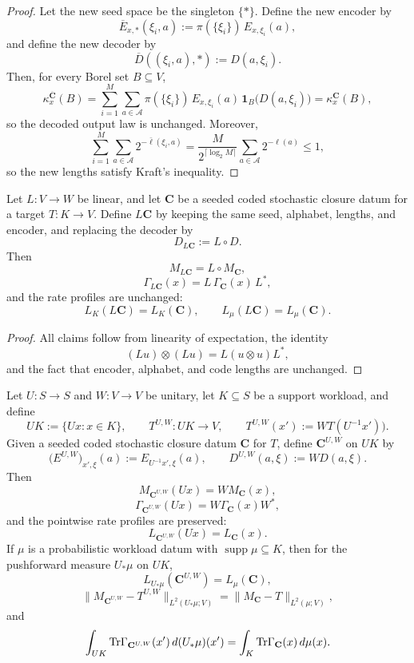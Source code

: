 \begin{proof}
Let the new seed space be the singleton \(\{\ast\}\). Define the new encoder by
\[
\overline E_{x,\ast}(\xi_i,a):=\pi(\{\xi_i\})\,E_{x,\xi_i}(a),
\]
and define the new decoder by
\[
\overline D((\xi_i,a),\ast):=D(a,\xi_i).
\]
Then, for every Borel set \(B\subseteq V\),
\[
\kappa^{\overline{\mathbf C}}_x(B)
=
\sum_{i=1}^M\sum_{a\in\mathcal A}
\pi(\{\xi_i\})\,E_{x,\xi_i}(a)\,
\mathbf 1_B\!\bigl(D(a,\xi_i)\bigr)
=
\kappa^{\mathbf C}_x(B),
\]
so the decoded output law is unchanged. Moreover,
\[
\sum_{i=1}^{M}\sum_{a\in\mathcal A}2^{-\bar\ell(\xi_i,a)}
=
\frac{M}{2^{\lceil \log_2 M\rceil}}
\sum_{a\in\mathcal A}2^{-\ell(a)}
\le 1,
\]
so the new lengths satisfy Kraft's inequality.
\end{proof}

\begin{theorem}
\label{thm:linear-output-composition}
Let \(L:V\to W\) be linear, and let \(\mathbf C\) be a seeded coded stochastic
closure datum for a target \(T:K\to V\). Define \(L\mathbf C\) by keeping the
same seed, alphabet, lengths, and encoder, and replacing the decoder by
\[
D_{L\mathbf C}:=L\circ D.
\]
Then
\[
M_{L\mathbf C}=L\circ M_{\mathbf C},
\]
\[
\Gamma_{L\mathbf C}(x)=L\,\Gamma_{\mathbf C}(x)\,L^\ast,
\]
and the rate profiles are unchanged:
\[
L_K(L\mathbf C)=L_K(\mathbf C),
\qquad
L_{\mu}(L\mathbf C)=L_{\mu}(\mathbf C).
\]
\end{theorem}

\begin{proof}
All claims follow from linearity of expectation, the identity
\[
(Lu)\otimes(Lu)=L(u\otimes u)L^\ast,
\]
and the fact that encoder, alphabet, and code lengths are unchanged.
\end{proof}

\begin{theorem}
\label{thm:unitary-coded-closure-covariance}
Let \(U:S\to S\) and \(W:V\to V\) be unitary, let \(K\subseteq S\) be a support
workload, and define
\[
UK:=\{Ux:x\in K\},
\qquad
T^{U,W}:UK\to V,
\qquad
T^{U,W}(x'):=WT(U^{-1}x')).
\]
Given a seeded coded stochastic closure datum \(\mathbf C\) for \(T\), define
\(\mathbf C^{U,W}\) on \(UK\) by
\[
\bigl(E^{U,W}\bigr)_{x',\xi}(a):=E_{U^{-1}x',\xi}(a),
\qquad
D^{U,W}(a,\xi):=W D(a,\xi).
\]
Then
\[
M_{\mathbf C^{U,W}}(Ux)=W M_{\mathbf C}(x),
\]
\[
\Gamma_{\mathbf C^{U,W}}(Ux)=W\Gamma_{\mathbf C}(x)W^\ast,
\]
and the pointwise rate profiles are preserved:
\[
L_{\mathbf C^{U,W}}(Ux)=L_{\mathbf C}(x).
\]
If \(\mu\) is a probabilistic workload datum with \(\operatorname{supp}\mu
\subseteq K\), then for the pushforward measure \(U_{\ast}\mu\) on \(UK\),
\[
L_{U_{\ast}\mu}(\mathbf C^{U,W})=L_{\mu}(\mathbf C),
\]
\[
\|M_{\mathbf C^{U,W}}-T^{U,W}\|_{L^2(U_{\ast}\mu;V)}
=
\|M_{\mathbf C}-T\|_{L^2(\mu;V)},
\]
and
\[
\int_{UK}\mathrm{Tr}\Gamma_{\mathbf C^{U,W}}(x')\,d(U_{\ast}\mu)(x')
=
\int_{K}\mathrm{Tr}\Gamma_{\mathbf C}(x)\,d\mu(x).
\]
\end{theorem}

